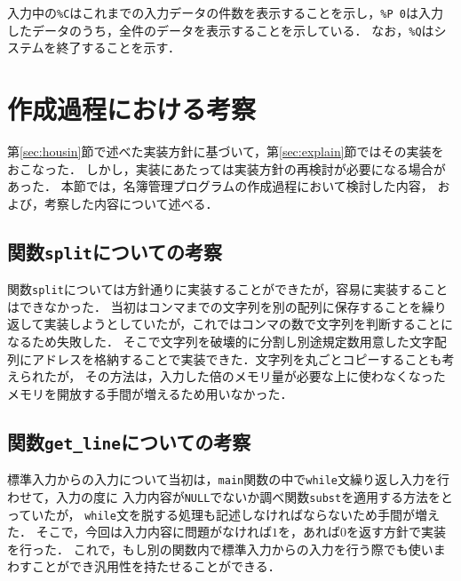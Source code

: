 \documentclass[a4j,11pt]{jarticle}
\begin{document}
\noindent
入力中の\verb|%C|はこれまでの入力データの件数を表示することを示し，\verb|%P 0|は入力したデータのうち，全件のデータを表示することを示している．
なお，\verb|%Q|はシステムを終了することを示す．

\section{作成過程における考察}


第\ref{sec:housin}節で述べた実装方針に基づいて，第\ref{sec:explain}節ではその実装をおこなった．
しかし，実装にあたっては実装方針の再検討が必要になる場合があった．
本節では，名簿管理プログラムの作成過程において検討した内容，
および，考察した内容について述べる．

\subsection{関数\texttt{split}についての考察}

関数\verb|split|については方針通りに実装することができたが，容易に実装することはできなかった．
当初はコンマまでの文字列を別の配列に保存することを繰り返して実装しようとしていたが，これではコンマの数で文字列を判断することになるため失敗した．
そこで文字列を破壊的に分割し別途規定数用意した文字配列にアドレスを格納することで実装できた．文字列を丸ごとコピーすることも考えられたが，
その方法は，入力した倍のメモリ量が必要な上に使わなくなったメモリを開放する手間が増えるため用いなかった．

\subsection{関数\texttt{get\_line}についての考察}
標準入力からの入力について当初は，\verb|main|関数の中で\verb|while|文繰り返し入力を行わせて，入力の度に
入力内容が\verb|NULL|でないか調べ関数\verb|subst|を適用する方法をとっていたが，
\verb|while|文を脱する処理も記述しなければならないため手間が増えた．
そこで，今回は入力内容に問題がなければ$1$を，あれば$0$を返す方針で実装を行った．
これで，もし別の関数内で標準入力からの入力を行う際でも使いまわすことができ汎用性を持たせることができる．
\end{document}

